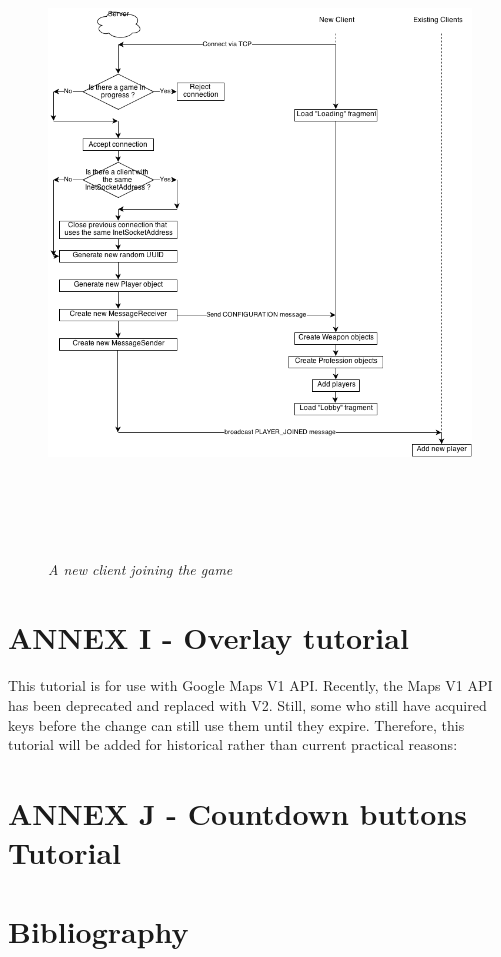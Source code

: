 \documentclass{article}
\begin{document}
\begin{figure}[ht]
\includegraphics[height=6.72in,width=7.12in]{./images/diagrams/Client-Server.png}
\caption{\small \sl A new client joining the game
\label{fig:client_server_flow}}
\end{figure}

\section{ANNEX I - Overlay tutorial}

This tutorial is for use with Google Maps V1 API. Recently, the Maps V1 API has
been deprecated and replaced with V2. Still, some who still have acquired keys
before the change can still use them until they expire. Therefore, this tutorial
will be added for historical rather than current practical reasons: \newline





\section{ANNEX J - Countdown buttons Tutorial}





\section{Bibliography}
		
	
\end{document}
